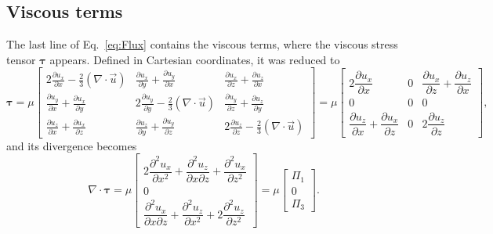 \documentclass[wes, manuscript]{copernicus}
\begin{document}
\subsection{Viscous terms}
The last line of Eq.~\eqref{eq:Flux} contains the viscous terms, where the viscous stress tensor
$\boldsymbol{\tau}$ appears. Defined in Cartesian coordinates, it was reduced to
%
\begin{equation}
\boldsymbol{\tau} = \mu
\begin{bmatrix}
2 \frac{\partial u_{x}}{\partial x} - \frac{2}{3} (\nabla\!\cdot\!\vec{u}) &
\frac{\partial u_{x}}{\partial y} + \frac{\partial u_{y}}{\partial x} &
\frac{\partial u_{x}}{\partial z} + \frac{\partial u_z}{\partial x} \\[6pt]
\frac{\partial u_{y}}{\partial x} + \frac{\partial u_{x}}{\partial y} &
2 \frac{\partial u_{y}}{\partial y} - \frac{2}{3} (\nabla\!\cdot\!\vec{u}) &
\frac{\partial u_{y}}{\partial z} + \frac{\partial u_z}{\partial y} \\[6pt]
\frac{\partial u_z}{\partial x} + \frac{\partial u_{x}}{\partial z} &
\frac{\partial u_z}{\partial y} + \frac{\partial u_{y}}{\partial z} &
2 \frac{\partial u_z}{\partial z} - \frac{2}{3} (\nabla\!\cdot\!\vec{u})
\end{bmatrix}
=
\mu
\begin{bmatrix}
2 \dfrac{\partial u_{x}}{\partial x} & 0 & \dfrac{\partial u_{x}}{\partial z}+\dfrac{\partial u_{z}}{\partial x} \\[8pt]
0 & 0 & 0 \\[8pt]
\dfrac{\partial u_{z}}{\partial x}+\dfrac{\partial u_{x}}{\partial z} & 0 & 2 \dfrac{\partial u_{z}}{\partial z}
\end{bmatrix},
\end{equation}
%
and its divergence becomes
%
\begin{equation}
\nabla \cdot \boldsymbol{\tau}=\mu
\begin{bmatrix}
2 \dfrac{\partial^2 u_{x}}{\partial x^2}
+\dfrac{\partial^2 u_{z}}{\partial x \partial z}
+\dfrac{\partial^2 u_{x}}{\partial z^2} \\[10pt]
0 \\[10pt]
\dfrac{\partial^2 u_{x}}{\partial x \partial z}
+\dfrac{\partial^2 u_{z}}{\partial x^2}
+2 \dfrac{\partial^2 u_{z}}{\partial z^2}
\end{bmatrix}
=
\mu
\begin{bmatrix}
\Pi_1 \\[6pt]
0 \\[6pt]
\Pi_3
\end{bmatrix}.
\end{equation}
\end{document}
